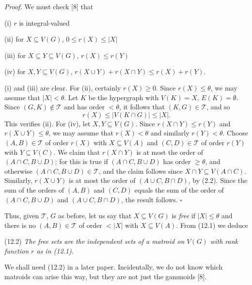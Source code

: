 \textit{Proof.} We must check [8] that

\hspace*{12pt}(i) $r$ is integral-valued

\hspace*{12pt}(ii) for $X \subseteq V(G)$, $0 \le r(X) \le |X|$

\hspace*{12pt}(iii) for $X \subseteq Y \subseteq V(G)$, $r(X) \le r(Y)$

\hspace*{12pt}(iv) for $X, Y \subseteq V(G)$, $r(X \cup Y) + r(X \cap Y) \le r(X) + r(Y)$.

\hspace*{12pt}(i) and (iii) are clear. For (ii), certainly $r(X) \ge 0$. Since $r(X) \le \theta$, we may assume that $|X| < \theta$. Let $K$ be the hypergraph with $V(K) = X$, $E(K) = \emptyset$. Since $(G, K) \notin \mathscr{T}$ and has order $< \theta$, it follows that $(K, G) \in \mathscr{T}$, and so
\begin{equation*}
r(X) \le |V(K \cap G)| \le |X|.
\end{equation*}
This verifies (ii). For (iv), let $X, Y \subseteq V(G)$. Since $r(X \cap Y) \le r(Y)$ and $r(X \cup Y) \le \theta$, we may assume that $r(X) < \theta$ and similarly $r(Y) < \theta$. Choose $(A, B) \in \mathscr{T}$ of order $r(X)$ with $X \subseteq V(A)$ and $(C, D) \in \mathscr{T}$ of order $r(Y)$ with $Y \subseteq V(C)$. We claim that $r(X \cap Y)$ is at most the order of $(A \cap C, B \cup D)$; for this is true if $(A \cap C, B \cup D)$ has order $\ge \theta$, and otherwise $(A \cap C, B \cup D) \in \mathscr{T}$, and the claim follows since $X \cap Y \subseteq V(A \cap C)$. Similarly, $r(X \cup Y)$ is at most the order of $(A \cup C, B \cap D)$, by (2.2). Since the sum of the orders of $(A, B)$ and $(C, D)$ equals the sum of the order of $(A \cap C, B \cup D)$ and $(A \cup C, B \cap D)$, the result follows. $\square$

Thus, given $\mathscr{T}$, $G$ as before, let us say that $X \subseteq V(G)$ is \textit{free} if $|X| \le \theta$ and there is no $(A, B) \in \mathscr{T}$ of order $< |X|$ with $X \subseteq V(A)$. From (12.1) we deduce

\stmt
(12.2) \textit{The free sets are the independent sets of a matroid on $V(G)$ with rank function $r$ as in (12.1).}

We shall need (12.2) in a later paper. Incidentally, we do not know which matroids can arise this way, but they are not just the gammoids [8].

